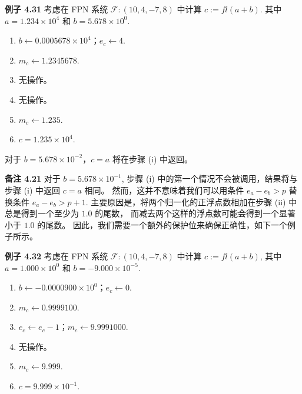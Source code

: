 \documentclass[a4paper]{ctexart}
\begin{document}
{%

\noindent \textbf{例子 4.31} 考虑在 FPN 系统 
$\mathcal{F} : (10, 4, -7, 8)$ 中计算 
$c := fl(a + b)$. 其中 $a = 1.234 \times 10^4$ 和 $b = 5.678 \times 10^0$.

\begin{enumerate}
    \item $b \leftarrow 0.0005678 \times 10^4$；$e_c \leftarrow 4$.
    \item $m_c \leftarrow 1.2345678$.
    \item 无操作。
    \item 无操作。
    \item $m_c \leftarrow 1.235$.
    \item $c = 1.235 \times 10^4$.
\end{enumerate}

对于 $b = 5.678 \times 10^{-2}$，$c = a$ 将在步骤 (i) 中返回。

\noindent \textbf{备注 4.21 } 对于 $b = 5.678 \times 10^{-1}$, 
步骤 (i) 中的第一个情况不会被调用，结果将与步骤 (i) 中返回 $c = a$ 相同。
然而，这并不意味着我们可以用条件 $e_a - e_b > p$ 替换条件 $e_a - e_b > p + 1$. 
主要原因是，将两个归一化的正浮点数相加在步骤 (ii) 中总是得到一个至少为 $1.0$ 的尾数，
而减去两个这样的浮点数可能会得到一个显著小于 $1.0$ 的尾数。
因此，我们需要一个额外的保护位来确保正确性，如下一个例子所示。

\noindent \textbf{例子 4.32 } 考虑在 FPN 系统 
$\mathcal{F} : (10, 4, -7, 8)$ 中计算 
$c := fl(a + b)$, 其中 $a = 1.000 \times 10^0$ 和 $b = -9.000 \times 10^{-5}$.

\begin{enumerate}
    \item $b \leftarrow -0.0000900 \times 10^0$；$e_c \leftarrow 0$.
    \item $m_c \leftarrow 0.9999100$.
    \item $e_c \leftarrow e_c - 1$；$m_c \leftarrow 9.9991000$.
    \item 无操作。
    \item $m_c \leftarrow 9.999$.
    \item $c = 9.999 \times 10^{-1}$.
\end{enumerate}

}
\end{document}
